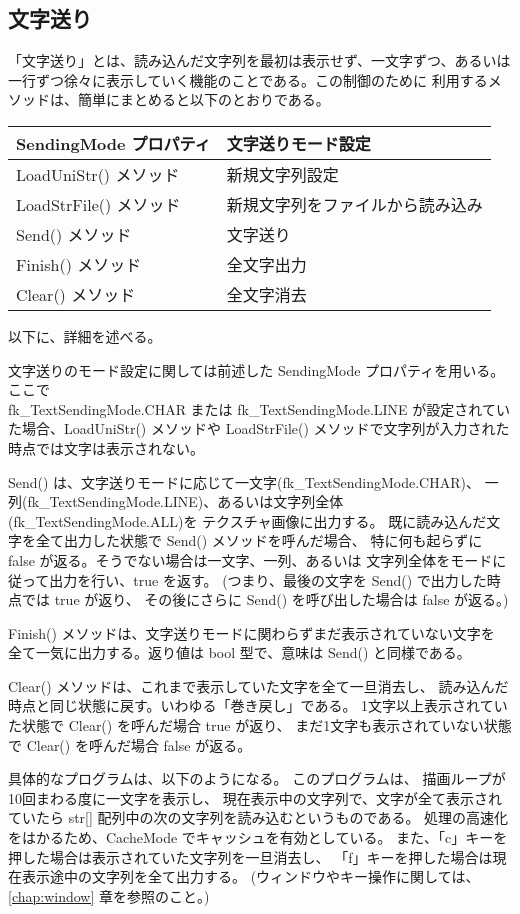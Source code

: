 \subsection{文字送り} \label{subsec:textSending}
「文字送り」とは、読み込んだ文字列を最初は表示せず、一文字ずつ、あるいは
一行ずつ徐々に表示していく機能のことである。この制御のために
利用するメソッドは、簡単にまとめると以下のとおりである。
\begin{center}
\begin{tabular}{|l|l|}
\hline
SendingMode プロパティ & 文字送りモード設定 \\ \hline
LoadUniStr() メソッド & 新規文字列設定 \\ \hline
LoadStrFile() メソッド & 新規文字列をファイルから読み込み \\ \hline
Send() メソッド & 文字送り \\ \hline
Finish() メソッド & 全文字出力 \\ \hline
Clear() メソッド & 全文字消去 \\ \hline
\end{tabular}
\end{center}
以下に、詳細を述べる。

文字送りのモード設定に関しては前述した SendingMode プロパティを用いる。ここで \\
fk\_TextSendingMode.CHAR または
fk\_TextSendingMode.LINE が設定されていた場合、LoadUniStr() メソッドや
LoadStrFile() メソッドで文字列が入力された時点では文字は表示されない。

Send() は、文字送りモードに応じて一文字(fk\_TextSendingMode.CHAR)、
一列(fk\_TextSendingMode.LINE)、あるいは文字列全体(fk\_TextSendingMode.ALL)を
テクスチャ画像に出力する。
既に読み込んだ文字を全て出力した状態で Send() メソッドを呼んだ場合、
特に何も起らずに false が返る。そうでない場合は一文字、一列、あるいは
文字列全体をモードに従って出力を行い、true を返す。
(つまり、最後の文字を Send() で出力した時点では true が返り、
その後にさらに Send() を呼び出した場合は false が返る。)

Finish() メソッドは、文字送りモードに関わらずまだ表示されていない文字を
全て一気に出力する。返り値は bool 型で、意味は Send() と同様である。

Clear() メソッドは、これまで表示していた文字を全て一旦消去し、
読み込んだ時点と同じ状態に戻す。いわゆる「巻き戻し」である。
1文字以上表示されていた状態で Clear() を呼んだ場合 true が返り、
まだ1文字も表示されていない状態で Clear() を呼んだ場合 false が返る。

具体的なプログラムは、以下のようになる。
このプログラムは、
描画ループが10回まわる度に一文字を表示し、
現在表示中の文字列で、文字が全て表示されていたら
str[] 配列中の次の文字列を読み込むというものである。
処理の高速化をはかるため、CacheMode でキャッシュを有効としている。
また、「c」キーを押した場合は表示されていた文字列を一旦消去し、
「f」キーを押した場合は現在表示途中の文字列を全て出力する。
(ウィンドウやキー操作に関しては、\ref{chap:window} 章を参照のこと。) \\

